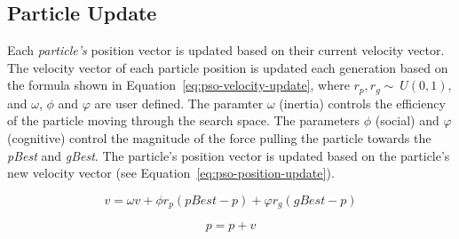 \subsection{Particle Update}
\label{subsec:pso-position}

Each \textit{particle's} position vector is updated based on their current velocity vector. The velocity vector of each particle position is updated each generation based on the formula shown in Equation~\ref{eq:pso-velocity-update}, where $r_p, r_g \sim\ U(0,1)$, and $\omega$, $\phi$ and $\varphi$ are user defined. The paramter $\omega$ (inertia) controls the efficiency of the particle moving through the search space. The parameters $\phi$ (social) and $\varphi$ (cognitive) control the magnitude of the force pulling the particle towards the \textit{pBest} and \textit{gBest}. The particle's position vector is updated based on the particle's new velocity vector (see Equation~\ref{eq:pso-position-update}).

\begin{equation}
	\label{eq:pso-velocity-update}
	v = \omega{v} + \phi{r_p}(pBest-p) + \varphi{r_g}(gBest-p)
\end{equation}

\begin{equation}
	\label{eq:pso-position-update}
	p = p + v
\end{equation}